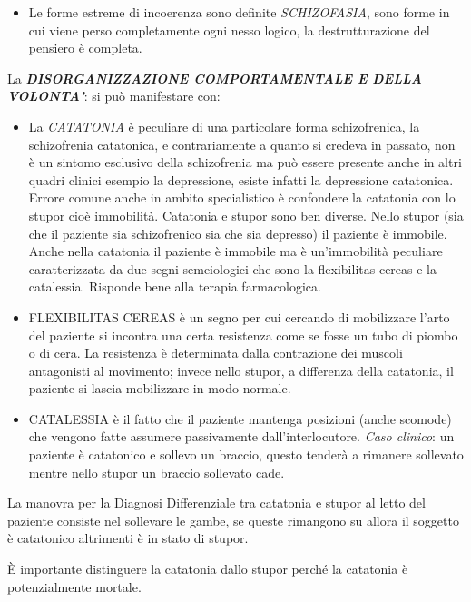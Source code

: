 \begin{itemize}
\begin{itemize}
\item
  Le forme estreme di incoerenza sono definite \emph{SCHIZOFASIA}, sono
  forme in cui viene perso completamente ogni nesso logico, la
  destrutturazione del pensiero è completa.
\end{itemize}

La \textbf{\emph{DISORGANIZZAZIONE COMPORTAMENTALE E DELLA VOLONTA'}}:
si può manifestare con:

\begin{itemize}
\item
  La \emph{CATATONIA} è peculiare di una particolare forma
  schizofrenica, la schizofrenia catatonica, e contrariamente a quanto
  si credeva in passato, non è un sintomo esclusivo della schizofrenia
  ma può essere presente anche in altri quadri clinici esempio la
  depressione, esiste infatti la depressione catatonica. Errore comune
  anche in ambito specialistico è confondere la catatonia con lo stupor
  cioè immobilità. Catatonia e stupor sono ben diverse. Nello stupor
  (sia che il paziente sia schizofrenico sia che sia depresso) il
  paziente è immobile. Anche nella catatonia il paziente è immobile ma è
  un'immobilità peculiare caratterizzata da due segni semeiologici che
  sono la flexibilitas cereas e la catalessia. Risponde bene alla
  terapia farmacologica.

\item
  FLEXIBILITAS CEREAS è un segno per cui cercando di mobilizzare l'arto
  del paziente si incontra una certa resistenza come se fosse un tubo di
  piombo o di cera. La resistenza è determinata dalla contrazione dei
  muscoli antagonisti al movimento; invece nello stupor, a differenza
  della catatonia, il paziente si lascia mobilizzare in modo normale.
\item
  CATALESSIA è il fatto che il paziente mantenga posizioni (anche
  scomode) che vengono fatte assumere passivamente dall'interlocutore.
  \emph{Caso clinico}: un paziente è catatonico e sollevo un braccio,
  questo tenderà a rimanere sollevato mentre nello stupor un braccio
  sollevato cade.
\end{itemize}

La manovra per la Diagnosi Differenziale tra catatonia e stupor al letto
del paziente consiste nel sollevare le gambe, se queste rimangono su
allora il soggetto è catatonico altrimenti è in stato di stupor.

È importante distinguere la catatonia dallo stupor perché la catatonia è
potenzialmente mortale.


\end{itemize}
